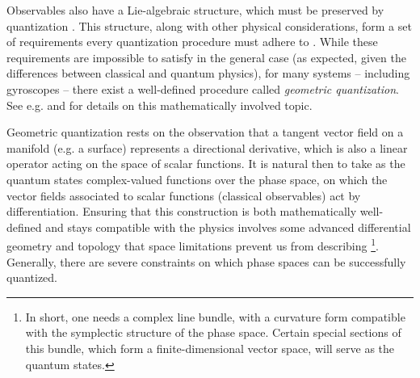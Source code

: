 \documentclass[12pt,final,3p]{elsarticle}
\begin{document}
\endgroup

Observables also have a Lie-algebraic structure, which must be preserved by quantization \cite{nlab2016quantization}. This structure, along with other physical considerations, form a set of requirements every quantization procedure must adhere to \cite{todorov2012quantization}. While these requirements are impossible to satisfy in the general case (as expected, given the differences between classical and quantum physics), for many systems -- including gyroscopes -- there exist a well-defined procedure called \textit{geometric quantization}. See e.g. \cite[Ch. 22-23]{hall2013quantum} and \cite{blau1992symplectic} for details on this mathematically involved topic.

Geometric quantization rests on the observation that a tangent vector field on a manifold (e.g. a surface) represents a directional derivative, which is also a linear operator acting on the space of scalar functions. It is natural then to take as the quantum states  complex-valued functions over the phase space, on which the vector fields associated to scalar functions (classical observables) act by differentiation. Ensuring that this construction is both mathematically well-defined and stays compatible with the physics involves some advanced differential geometry and topology that space limitations prevent us from describing \footnote{In short, one needs a complex line bundle, with a curvature form compatible with the symplectic structure of the phase space. Certain special sections of this bundle, which form a finite-dimensional vector space, will serve as the quantum states.}. Generally, there are severe constraints on which phase spaces can be successfully quantized.  
\end{document}
